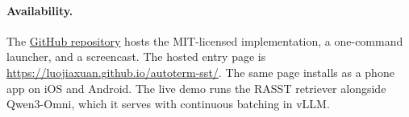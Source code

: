 \paragraph{Availability.}
The \href{https://github.com/luojiaxuan/autoterm-sst}{GitHub repository}
hosts the MIT-licensed implementation, a one-command launcher, and a screencast.
The hosted entry page is \url{https://luojiaxuan.github.io/autoterm-sst/}.
The same page installs as a phone app on iOS and Android.
The live demo runs the RASST retriever alongside Qwen3-Omni, which it
serves with continuous batching in vLLM.
